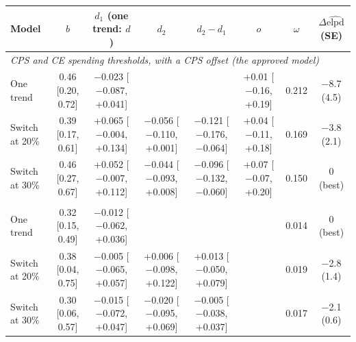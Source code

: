 \scriptsize
\begin{tabular}{lccccccc}
\toprule
Model & $b$ & $d_1$ (one trend: $d$) & $d_2$ & $d_2-d_1$ & $o$ & $\omega$ & $\Delta\widehat{\mathrm{elpd}}$ (SE) \\
\midrule
\multicolumn{8}{l}{\textit{CPS and CE spending thresholds, with a CPS offset (the approved model)}} \\
One trend & 0.46 [0.20, 0.72] & $-$0.023 [$-$0.087, +0.041] &  &  & +0.01 [$-$0.16, +0.19] & 0.212 & $-$8.7 (4.5) \\
Switch at 20\% & 0.39 [0.17, 0.61] & +0.065 [$-$0.004, +0.134] & $-$0.056 [$-$0.110, +0.001] & $-$0.121 [$-$0.176, $-$0.064] & +0.04 [$-$0.11, +0.18] & 0.169 & $-$3.8 (2.1) \\
Switch at 30\% & 0.46 [0.27, 0.67] & +0.052 [$-$0.007, +0.112] & $-$0.044 [$-$0.093, +0.008] & $-$0.096 [$-$0.132, $-$0.060] & +0.07 [$-$0.07, +0.20] & 0.150 & 0 (best) \\
\addlinespace
\multicolumn{8}{l}{\textit{CPS spending thresholds alone (check)}} \\
One trend & 0.32 [0.15, 0.49] & $-$0.012 [$-$0.062, +0.036] &  &  &  & 0.014 & 0 (best) \\
Switch at 20\% & 0.38 [0.04, 0.75] & $-$0.005 [$-$0.065, +0.057] & +0.006 [$-$0.098, +0.122] & +0.013 [$-$0.050, +0.079] &  & 0.019 & $-$2.8 (1.4) \\
Switch at 30\% & 0.30 [0.06, 0.57] & $-$0.015 [$-$0.072, +0.047] & $-$0.020 [$-$0.095, +0.069] & $-$0.005 [$-$0.038, +0.037] &  & 0.017 & $-$2.1 (0.6) \\
\bottomrule
\end{tabular}
